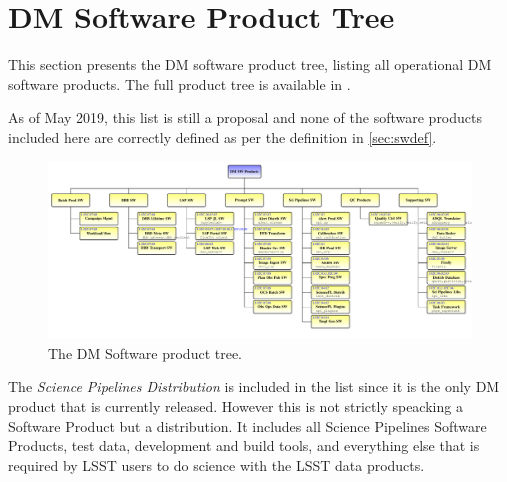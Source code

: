 \newpage
\section{DM Software Product Tree}\label{sec:swptree}

This section presents the \gls{DM} software product tree, listing all operational \gls{DM} software products.
The full product tree is available in .

As of May 2019, this list is still a proposal and none of the software products included here are correctly defined as per the definition in \ref{sec:swdef}.



\begin{figure}
\begin{center}
 \includegraphics[width=1.1\textwidth]{ProductTreeLand}

 \caption{The \gls{DM} Software product tree.}
 \label{fig:doctree}

\end{center}
\end{figure}

The \textit{Science Pipelines Distribution} is included in the list since it is the only \gls{DM} product that is currently released.
However this is not strictly speacking a Software Product but a distribution.
It includes all Science Pipelines Software Products, test data, development and build tools, and everything else that is required by LSST users to do science with the LSST data products.
